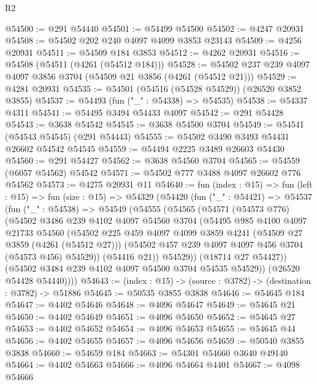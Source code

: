 \begin{lexlean}{R2}
\begin{coremodule}
@54500 := @291 @54440
@54501 := @54499 @54500
@54502 := @4247 @20931
@54508 := @54502 @202 @240 @4097 @4099 @3853 @23143
@54509 := @4256 @20931
@54511 := @54509 @184 @3853
@54512 := @4262 @20931
@54516 := @54508 (@54511 (@4261 (@54512 @184)))
@54528 := @54502 @237 @239 @4097 @4097 @3856 @3704 (@54509 @21 @3856 (@4261 (@54512 @21)))
@54529 := @4281 @20931
@54535 := @54501 (@54516 (@54528 @54529)) (@26520 @3852 @3855)
@54537 := @54493 (fun ("_" : @54338) => @54535)
@54538 := @54337 @4311
@54541 := @54495 @3494 @54433 @4097
@54542 := @291 @54428
@54543 := @3638 @54542
@54545 := @3638 @54500 @3704
@54549 := @54541 (@54543 @54545) (@291 @54443)
@54555 := @54502 @3490 @3493 @54431 @26602 @54542 @54545
@54559 := @54494 @2225 @3489 @26603 @54430
@54560 := @291 @54427
@54562 := @3638 @54560 @3704
@54565 := @54559 (@6057 @54562) @54542
@54571 := @54502 @777 @3488 @4097 @26602 @776 @54562
@54573 := @4275 @20931 @11
@54640 := fun (index : @15) =>
  fun (left : @15) =>
  fun (size : @15) =>
  @54329
    (@54420
      (fun ("_" : @54421) =>
      @54537
        (fun ("_" : @54538) =>
        @54549
          (@54555
            (@54565
              (@54571
                (@54573 @776)
                (@54502
                  @3486
                  @239
                  @4102
                  @4097
                  @54560
                  @3704
                  (@54495
                    @985
                    @4100
                    @4097
                    @21733
                    @54560
                    (@54502
                      @225
                      @459
                      @4097
                      @4099
                      @3859
                      @4241
                      (@54509 @27 @3859 (@4261 (@54512 @27)))
                      (@54502 @457 @239 @4097 @4097 @456 @3704 (@54573 @456) @54529))
                    (@54416 @21))
                  @54529))
              (@18714 @27 @54427))
            (@54502 @3484 @239 @4102 @4097 @54500 @3704 @54535 @54529))
          (@26520 @54428 @54440))))
@54643 := (index : @15) -> (source : @3782) -> (destination : @3782) -> @51886
@54645 := @50535 @3855 @3838
@54646 := @54645 @184
@54647 := @4402 @54646
@54648 := @4096 @54647
@54649 := @54645 @21
@54650 := @4402 @54649
@54651 := @4096 @54650
@54652 := @54645 @27
@54653 := @4402 @54652
@54654 := @4096 @54653
@54655 := @54645 @44
@54656 := @4402 @54655
@54657 := @4096 @54656
@54659 := @50540 @3855 @3838
@54660 := @54659 @184
@54663 := @54301 @54660 @3640 @49140
@54664 := @4402 @54663
@54666 := @4096 @54664 @4401
@54667 := @4098 @54666

\end{coremodule}
\end{lexlean}
